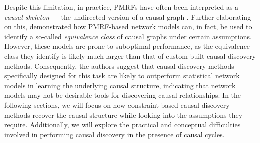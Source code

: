 \documentclass[twoside, 11pt]{article}
\newcommand*{\figref}[2][]{%
  \hyperref[{fig:#2}]{%
    Figure~\ref*{fig:#2}%
    \ifx\\#1\\%
    \else
      #1%
    \fi
  }%
}
\begin{document}
Despite this limitation, in practice, PMRFs have often been interpreted as a \textit{causal skeleton} --- the undirected version of a causal graph \citep{haslbeck_how_2018}. 
Further elaborating on this, \cite{Ryan2022} demonstrated how PMRF-based network models can, in fact, be used to identify a so-called \textit{equivalence class} of causal graphs under certain assumptions. However, these models are prone to suboptimal performance, as the equivalence class they identify is likely much larger than that of custom-built causal discovery methods. Consequently, the authors suggest that causal discovery methods specifically designed for this task are likely to outperform statistical network models in learning the underlying causal structure, indicating that network models may not be desirable tools for discovering causal relationships.
In the following sections, we will focus on how constraint-based causal discovery methods recover the causal structure while looking into the assumptions they require. Additionally, we will explore the practical and conceptual difficulties involved in performing causal discovery in the presence of causal cycles.


\end{document}
